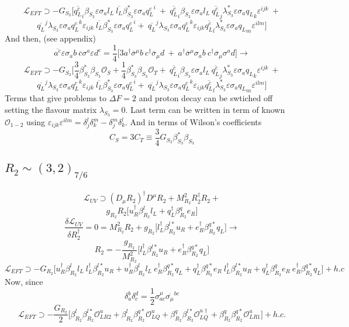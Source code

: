 \documentclass{article}
\begin{document}
\[
\mathcal{L}_{EFT} \supset -G_{S_3} \big[ \overline{q_L^c}_i \beta_{S_3} \varepsilon \sigma_a l_L \ \overline{l_L} \beta_{S_3}^* \varepsilon \sigma_a {q^c_L}^i \ + \ \overline{q_L^c}_i \beta_{S_3} \varepsilon \sigma_a l_L \ \overline{q_L^c}_j \lambda^*_{S_3} \varepsilon \sigma_a {q_L}_k \varepsilon^{ijk} \ +
\]
\[  \overline{q_L}^j \lambda_{S_3} \varepsilon \sigma_a {q^c_L}^k \varepsilon_{ijk} \ \overline{l_L} \beta_{S_3}^* \varepsilon \sigma_a {q^c_L}^i + \ \overline{q_L}^j \lambda_{S_3} \varepsilon \sigma_a {q^c_L}^k \varepsilon_{ijk} \overline{q_L^c}_l \lambda^*_{S_3} \varepsilon \sigma_a {q_L}_m \varepsilon^{ilm} \big] 
\]
And then, (see appendix)
\[
\overline{a^c} \varepsilon \sigma_a b \  \overline{c} \sigma^a \varepsilon  d^c= \frac{1}{4}\big[3 a^\dagger \overline{\sigma}^ \mu b \ c^\dagger \overline{\sigma}_\mu d \ + \ a^\dagger \overline{\sigma}^\mu  \sigma_a b \ c^\dagger \overline{\sigma}_\mu  \sigma^a d \big] \rightarrow
\]
\[
\mathcal{L}_{EFT} \supset -G_{S_3} \big[ \frac{3}{4} \beta_{S_3}^* \beta_{S_3} \mathcal{O}_S + \frac{1}{4}\beta_{S_3}^* \beta_{S_3} \mathcal{O}_T + \ \overline{q_L^c}_i \beta_{S_3} \varepsilon \sigma_a l_L \ \overline{q_L^c}_j \lambda^*_{S_3} \varepsilon \sigma_a {q_L}_k \varepsilon^{ijk} \ +
\]
\[  \overline{q_L}^j \lambda_{S_3} \varepsilon \sigma_a {q^c_L}^k \varepsilon_{ijk} \ \overline{l_L} \beta_{S_3}^* \varepsilon \sigma_a {q^c_L}^i + \ \overline{q_L}^j \lambda_{S_3} \varepsilon \sigma_a {q^c_L}^k \varepsilon_{ijk} \overline{q_L^c}_l \lambda^*_{S_3} \varepsilon \sigma_a {q_L}_m \varepsilon^{ilm} \big] 
\]
Terms that give problems to $\Delta F=2$ and proton decay can be swtiched off setting the flavour matrix $\lambda_{S_3}=0$. Last term can be written in term of known $\mathcal{O}_{1-2}$ using $\varepsilon_{ijk} \varepsilon^{ilm} = \delta_j^l \delta_k^m -\delta_j^m \delta_k^l $.
And in terms of Wilson's coefficients
\[
C_S = 3 C_T \equiv \frac{3}{4} G_{S_3} \beta_{S_3}^* \beta_{S_3}
\]

\subsection{$R_2 \sim (3,2)_{7/6}$}
\[
\mathcal{L}_{UV} \supset  (D_\mu R_2)^\dagger D^\mu R_2 + M^2_{R_2} R_2^\dagger R_2 +
\]
\[
g_{R_2} R_2 \big[u_R^\dagger \beta_{R_2}^l l_L + q_L^\dagger \beta_{R_2}^q e_R \big]
\]
\[
\frac{\delta \mathcal{L}_{UV}}{\delta R_2^\dagger}=0= M_{R_2}^2 R_2 + g_{R_2}\big[l_L^\dagger\beta_{R_2}^{l*} u_R  + e_R^\dagger\beta_{R_2}^{q*} q_L \big] \rightarrow
\]
\[
R_2 = - \frac{g_{R_2}}{M^2_{R_2}} \big[l_L^\dagger \beta_{R_2}^{l*} u_R  + e_R^\dagger \beta_{R_2}^{q*} q_L \big]
\]
\[
\mathcal{L}_{EFT} \supset -G_{R_2} \big[ u_R^\dagger\beta_{R_2}^l l_L \ l_L^\dagger \beta_{R_2}^{l*} u_R + u_R^\dagger \beta_{R_2}^l l_L \ e_R^\dagger \beta_{R_2}^{q*} q_L  + q_L^\dagger \beta_{R_2}^{q*} e_R \   l_L^\dagger \beta_{R_2}^{l*} u_R + q_L^\dagger \beta_{R_2}^q e_R \ e_R^\dagger \beta_{R_2}^{q*} q_L \big] +h.c
\]
Now, since  
\[
\delta_a^b \delta_c^d = \frac{1}{2} \sigma^\mu_{ac} \overline{\sigma_\mu}^{bc}
\]
\[
\mathcal{L}_{EFT} \supset -\frac{G_{R_2}}{2} \big[ \beta_{R_2}^l  \beta_{R_2}^{l*} \mathcal{O}_{LR2}^u +  \beta_{R_2}^l \beta_{R_2}^{q*}  \mathcal{O}_{LQ}^u + \beta_{R_2}^{q}  \beta_{R_2}^{l*} \mathcal{O}_{LQ}^{u\dagger} +  \beta_{R_2}^q    \beta_{R_2}^{q*} \mathcal{O}_{LR1}^u  \big]
 +h.c.
\]
\end{document}
